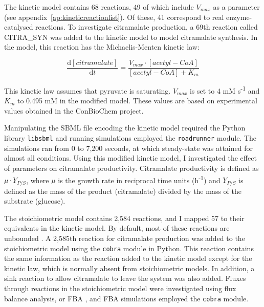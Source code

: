 \documentclass[parskip=full, numbers=noenddot]{scrreprt}
\begin{document}
The kinetic model contains 68 reactions, 49 of which include $V_{max}$ as a parameter (see appendix~\ref{ap:kineticreactionlist}). Of these, 41 correspond to real enzyme-catalysed reactions.
To investigate citramalate production, a 69th reaction called CITRA\_SYN was added to the kinetic model to model citramalate synthesis.  In the model, this reaction has the Michaelis-Menten kinetic law:

\begin{equation}
  \frac{\mathrm{d}[citramalate]}{\mathrm{d}t} = 
  \frac{V_{max} \cdot [acetyl-CoA]}{[acetyl-CoA] + K_{m}}
\end{equation}
\label{eq:michaelismenten}

This kinetic law assumes that pyruvate is saturating. $V_{max}$ is set to 4 mM s\textsuperscript{-1} and $K_{m}$ to 0.495 mM in the modified model. These values are based on experimental values obtained in the ConBioChem project.

Manipulating the SBML file encoding the kinetic model required the Python library \texttt{libsbml} \citep{bornstein_libsbml:_2008} and running simulations employed the \texttt{roadrunner} \citep{somogyi_libroadrunner:_2015} module. The simulations ran from 0 to 7,200 seconds, at which steady-state was attained for almost all conditions.
Using this modified kinetic model, I investigated the effect of parameters on citramalate productivity. Citramalate productivity is defined as $\mu \cdot Y_{P/S}$, where $\mu$ is the growth rate in reciprocal time units (h\textsuperscript{-1}) and $Y_{P/S}$ is defined as the mass of the product (citramalate) divided by the mass of the substrate (glucose).


The stoichiometric model contains 2,584 reactions, and I mapped 57 to their equivalents in the kinetic model. By default, most of these reactions are unbounded \citep{orth_comprehensive_2011}.
A 2,585th reaction for citramalate production was added to the stoichiometric model using the \texttt{cobra} module \citep{ebrahim_cobrapy:_2013} in Python. This reaction contains the same information as the reaction added to the kinetic model except for the kinetic law, which is normally absent from stoichiometric models. In addition, a sink reaction to allow citramalate to leave the system was also added.
Fluxes through reactions in the stoichiometric model were investigated using flux balance analysis, or FBA \citep{orth_what_2010}, and FBA simulations employed the \texttt{cobra} module.
\end{document}
